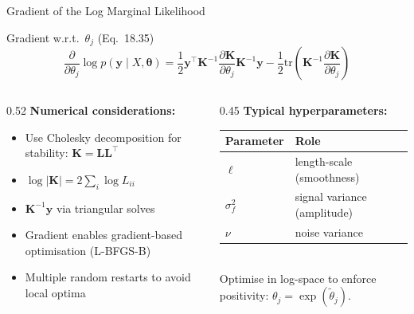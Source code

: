 \documentclass[aspectratio=169,10pt]{beamer}
\begin{document}
\begin{frame}{Gradient of the Log Marginal Likelihood}
  \begin{block}{Gradient w.r.t.\ $\theta_j$ (Eq.\ 18.35)}
    \[
      \frac{\partial}{\partial\theta_j}\log p(\mathbf{y}\mid X,\boldsymbol{\theta})
      = \frac{1}{2}\mathbf{y}^\top\mathbf{K}^{-1}
        \frac{\partial\mathbf{K}}{\partial\theta_j}\mathbf{K}^{-1}\mathbf{y}
        - \frac{1}{2}\mathrm{tr}\!\left(\mathbf{K}^{-1}
          \frac{\partial\mathbf{K}}{\partial\theta_j}\right)
    \]
  \end{block}
  \vspace{0.3em}
  \begin{columns}[T]
    \begin{column}{0.52\textwidth}
      \textbf{Numerical considerations:}
      \begin{itemize}
        \item Use Cholesky decomposition for stability:
              $\mathbf{K} = \mathbf{L}\mathbf{L}^\top$
        \item $\log|\mathbf{K}| = 2\sum_i \log L_{ii}$
        \item $\mathbf{K}^{-1}\mathbf{y}$ via triangular solves
        \item Gradient enables gradient-based optimisation (L-BFGS-B)
        \item Multiple random restarts to avoid local optima
      \end{itemize}
    \end{column}
    \begin{column}{0.45\textwidth}
      \textbf{Typical hyperparameters:}\\[0.3em]
      \begin{tabular}{ll}
        \toprule
        \textbf{Parameter} & \textbf{Role}\\
        \midrule
        $\ell$ & length-scale (smoothness)\\
        $\sigma_f^2$ & signal variance (amplitude)\\
        $\nu$ & noise variance\\
        \bottomrule
      \end{tabular}\\[0.5em]
      Optimise in log-space to enforce positivity:
      $\theta_j = \exp(\tilde\theta_j)$.
    \end{column}
  \end{columns}
\end{frame}
\end{document}
